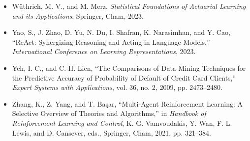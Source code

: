 \documentclass{book}
\begin{document}
\begin{itemize}
    \item W{\"u}thrich, M. V., and M. Merz, \emph{Statistical Foundations of Actuarial Learning and its Applications}, Springer, Cham, 2023.
    \item Yao, S., J. Zhao, D. Yu, N. Du, I. Shafran, K. Narasimhan, and Y. Cao, ``ReAct: Synergizing Reasoning and Acting in Language Models,'' \emph{International Conference on Learning Representations}, 2023.
    \item Yeh, I.-C., and C.-H. Lien, ``The Comparisons of Data Mining Techniques for the Predictive Accuracy of Probability of Default of Credit Card Clients,'' \emph{Expert Systems with Applications}, vol. 36, no. 2, 2009, pp. 2473--2480.
    \item Zhang, K., Z. Yang, and T. Ba\c{s}ar, ``Multi-Agent Reinforcement Learning: A Selective Overview of Theories and Algorithms,'' in \emph{Handbook of Reinforcement Learning and Control}, K. G. Vamvoudakis, Y. Wan, F. L. Lewis, and D. Cansever, eds., Springer, Cham, 2021, pp. 321--384.
\end{itemize}

\clearpage
{}
\printindex
\end{document}
